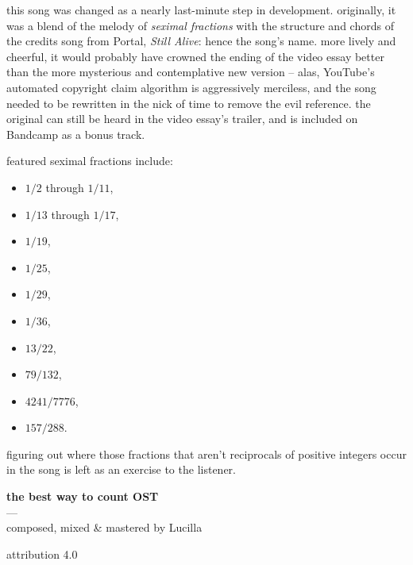 \documentclass[a4paper, 12pt]{report}
\begin{document}
this song was changed as a nearly last-minute step in development. originally, it was a blend of the melody of {\it seximal fractions} with the structure and chords of the credits song from Portal, {\it Still Alive}: hence the song's name. more lively and cheerful, it would probably have crowned the ending of the video essay better than the more mysterious and contemplative new version -- alas, YouTube's automated copyright claim algorithm is aggressively merciless, and the song needed to be rewritten in the nick of time to remove the evil reference. the original can still be heard in the video essay's trailer, and is included on Bandcamp as a bonus track.

featured seximal fractions include: \bigskip

\begin{itemize}
	\item $1/2$ through $1/11$,
	\item $1/13$ through $1/17$,
	\item $1/19$,
	\item $1/25$,
	\item $1/29$,
	\item $1/36$,
	\item $13/22$,
	\item $79/132$,
	\item $4241/7776$,
	\item $157/288$.
\end{itemize}

\bigskip

figuring out where those fractions that aren't reciprocals of positive integers occur in the song is left as an exercise to the listener.

\newpage


\vspace*{\fill} \centering

{\bf the best way to count OST} \smallskip \\
\jo\jo\io\jo\jo\jo\iz\jz\jo\jo\iz---\,\jo\jo\io\jo\jo\jo\iz\jz\jo\jo\io \\
composed, mixed \& mastered by Lucilla \bigskip

attribution 4.0
\end{document}
